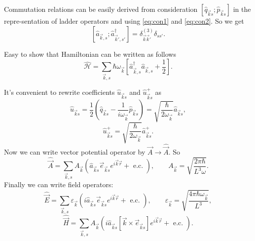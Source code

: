 	Commutation relations can be easily derived from consideration $\left[ \hat{q}_{\vec{k}s} ; \hat{p}_{\vec{k}s} \right]$ in the repre-sentation  of ladder operators and using \eqref{eq:con1} and \eqref{eq:con2}. So we get
	\begin{equation}
		\left[ \hat{a}_{\vec{k},s} ; \hat{a}^{\dagger}_{\vec{k}',s'} \right] = \delta^{(3)}_{\vec{k}\vec{k}'} \delta_{ss'}.
	\end{equation}
	
	Easy to  show that Hamiltonian can be written as follows
	\begin{equation}
		\hat{\mathscr{H}} = \sum_{\vec{k},s} \hbar \omega_{\vec{k}} \left[ \hat{a}^{\dagger}_{\vec{k},s} \hat{a}_{\vec{k},s} + \frac{1}{2} \right].
	\end{equation}
	
	It's convenient to rewrite coefficients $\hat{u}_{\vec{k}s}$ and $\hat{u}^+_{\vec{k}s}$ as
	\begin{equation}
		\hat{u}_{\vec{k}s} = \frac{1}{2} \left( \hat{q}_{\vec{k}s} - \frac{1}{i \omega_{\vec{k}}} \hat{p}_{\vec{k}s}  \right) = \sqrt{\frac{\hbar}{2 \omega_{\vec{k}}}} \hat{a}_{\vec{k}s},
	\end{equation}
	\begin{equation}
		\hat{u}^+_{\vec{k}s} = \sqrt{\frac{\hbar}{2 \omega_{\vec{k}}}} \hat{a}^+_{\vec{k}s}.
	\end{equation}
	Now we can write vector potential operator by $\vec{A} \to \hat{\vec{A}}$. So
	\begin{equation}
		\boxed{\hat{\vec{A}} = \sum_{\vec{k},s} A_{\vec{k}} \left( \hat{a}_{\vec{k}s} \vec{e}_{\vec{k}s} e^{i \vec{k} \vec{r}} + \text{ e.c. } \right), \qquad A_{\vec{k}} = \sqrt{\frac{2 \pi \hbar}{L^3 \omega}}.}
	\end{equation}
	Finally we can write field operators:
	\begin{equation}
		\boxed{\hat{\vec{E}} = \sum_{\vec{k},s} \varepsilon_{\vec{k}} \left( i \hat{a}_{\vec{k}s} \vec{e}_{\vec{k}s} e^{i \vec{k} \vec{r}} + \text{ e.c. } \right), \qquad \varepsilon_{\vec{k}} = \sqrt{\frac{4 \pi \hbar \omega_{\vec{k}}}{L^3}},}
	\end{equation}
	\begin{equation}
		\boxed{\hat{\vec{H}} = \sum_{\vec{k},s} A_{\vec{k}} \left( i \hat{a}_{\vec{k}s} \left[ \vec{k} \times \vec{e}_{\vec{k}s} \right] e^{i \vec{k} \vec{r}} + \text{ e.c. } \right).}
	\end{equation}
	